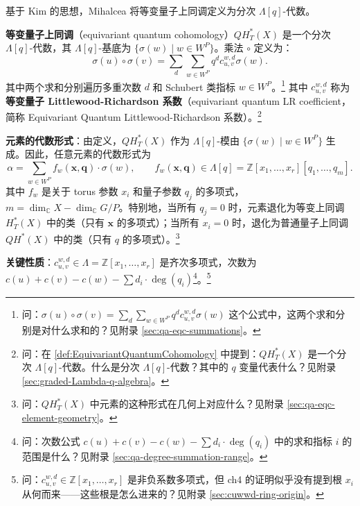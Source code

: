 基于 Kim 的思想，Mihalcea 将等变量子上同调定义为分次 $\Lambda[q]$-代数。

\begin{Definition}
\label{def:EquivariantQuantumCohomology}
\textbf{等变量子上同调}（equivariant quantum cohomology）$QH_T^*(X)$ 是一个分次 $\Lambda[q]$-代数，其 $\Lambda[q]$-基底为 $\{\sigma(w) \mid w \in W^P\}$。乘法 $\circ$ 定义为：
\begin{equation}
\sigma(u) \circ \sigma(v) = \sum_{d} \sum_{w \in W^P} q^d c_{u,v}^{w,d} \sigma(w).
\label{eq:EQCDefinition}
\end{equation}
其中两个求和分别遍历多重次数 $d$ 和 Schubert 类指标 $w \in W^P$。\footnote{问：$\sigma(u) \circ \sigma(v) = \sum_{d} \sum_{w \in W^P} q^d c_{u,v}^{w,d} \sigma(w)$ 这个公式中，这两个求和分别是对什么求和的？见附录 \cref{sec:qa-eqc-summations}。}
其中 $c_{u,v}^{w,d}$ 称为\textbf{等变量子 Littlewood-Richardson 系数}（equivariant quantum LR coefficient，简称 Equivariant Quantum Littlewood-Richardson 系数）。\footnote{问：在 \cref{def:EquivariantQuantumCohomology} 中提到：$QH_T^*(X)$ 是一个分次 $\Lambda[q]$-代数。什么是分次 $\Lambda[q]$-代数？其中的 $q$ 变量代表什么？见附录 \cref{sec:graded-Lambda-q-algebra}。}
\end{Definition}

\textbf{元素的代数形式}：由定义，$QH_T^*(X)$ 作为 $\Lambda[q]$-模由 $\{\sigma(w) \mid w \in W^P\}$ 生成。因此，任意元素的代数形式为
\[
\alpha = \sum_{w \in W^P} f_w(\mathbf{x}, \mathbf{q}) \cdot \sigma(w), \qquad f_w(\mathbf{x}, \mathbf{q}) \in \Lambda[q] = \mathbb{Z}[x_1,\ldots,x_r][q_1,\ldots,q_m].
\]
其中 $f_w$ 是关于 torus 参数 $x_i$ 和量子参数 $q_j$ 的多项式，$m = \dim_{\mathbb{C}} X - \dim_{\mathbb{C}} G/P$。特别地，当所有 $q_j = 0$ 时，元素退化为等变上同调 $H_T^*(X)$ 中的类（只有 $\mathbf{x}$ 的多项式）；当所有 $x_i = 0$ 时，退化为普通量子上同调 $QH^*(X)$ 中的类（只有 $q$ 的多项式）。\footnote{问：$QH_T^*(X)$ 中元素的这种形式在几何上对应什么？见附录 \cref{sec:qa-eqc-element-geometry}。}

\textbf{关键性质}：$c_{u,v}^{w,d} \in \Lambda = \mathbb{Z}[x_1, \ldots, x_r]$ 是齐次多项式，次数为 $c(u) + c(v) - c(w) - \sum d_i \cdot \deg(q_i)$\footnote{问：次数公式 $c(u) + c(v) - c(w) - \sum d_i \cdot \deg(q_i)$ 中的求和指标 $i$ 的范围是什么？见附录 \cref{sec:qa-degree-summation-range}。}。\footnote{问：$c_{u,v}^{w,d} \in \mathbb{Z}[x_1, \ldots, x_r]$ 是非负系数多项式，但 ch4 的证明似乎没有提到根 $x_i$ 从何而来——这些根是怎么进来的？见附录 \cref{sec:cuwwd-ring-origin}。}

